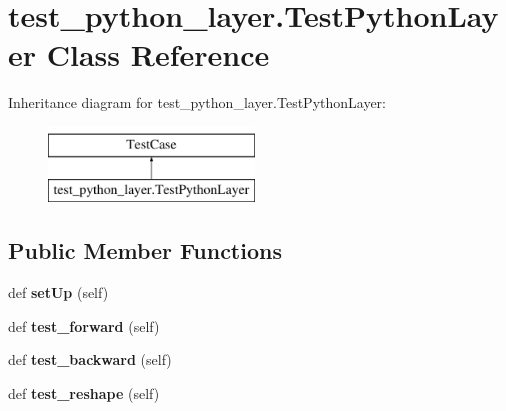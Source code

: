 \hypertarget{classtest__python__layer_1_1_test_python_layer}{}\section{test\+\_\+python\+\_\+layer.\+Test\+Python\+Layer Class Reference}
\label{classtest__python__layer_1_1_test_python_layer}
Inheritance diagram for test\+\_\+python\+\_\+layer.\+Test\+Python\+Layer\+:\begin{figure}[H]
\begin{center}
\leavevmode
\includegraphics[height=2.000000cm]{classtest__python__layer_1_1_test_python_layer}
\end{center}
\end{figure}
\subsection*{Public Member Functions}
\begin{DoxyCompactItemize}
\item 
\hypertarget{classtest__python__layer_1_1_test_python_layer_a92caa30cfd251d89a3b749732e32311a}{}def {\bfseries set\+Up} (self)\label{classtest__python__layer_1_1_test_python_layer_a92caa30cfd251d89a3b749732e32311a}

\item 
\hypertarget{classtest__python__layer_1_1_test_python_layer_a62f12e77e948803bb7e8ca991a61a400}{}def {\bfseries test\+\_\+forward} (self)\label{classtest__python__layer_1_1_test_python_layer_a62f12e77e948803bb7e8ca991a61a400}

\item 
\hypertarget{classtest__python__layer_1_1_test_python_layer_a412a085a926adef9cc07061c0920803d}{}def {\bfseries test\+\_\+backward} (self)\label{classtest__python__layer_1_1_test_python_layer_a412a085a926adef9cc07061c0920803d}

\item 
\hypertarget{classtest__python__layer_1_1_test_python_layer_ac51f16c7dc35da4db4843d8f33738180}{}def {\bfseries test\+\_\+reshape} (self)\label{classtest__python__layer_1_1_test_python_layer_ac51f16c7dc35da4db4843d8f33738180}

\end{DoxyCompactItemize}
